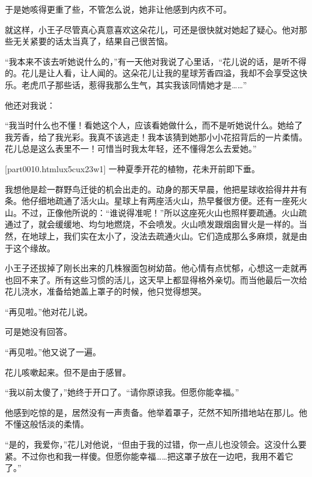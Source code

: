 于是她咳得更重了些，不管怎么说，她非让他感到内疚不可。

就这样，小王子尽管真心真意喜欢这朵花儿，可还是很快就对她起了疑心。他对那些无关紧要的话太当真了，结果自己很苦恼。

“我本来不该去听她说什么的，”有一天他对我说了心里话，“花儿说的话，是听不得的。花儿是让人看，让人闻的。这朵花儿让我的星球芳香四溢，我却不会享受这快乐。老虎爪子那些话，惹得我那么生气，其实我该同情她才是\ldots{}\ldots{}”

{\startalignment[center]
 \stopalignment}

他还对我说：

“我当时什么也不懂！看她这个人，应该看她做什么，而不是听她说什么。她给了我芳香，给了我光彩。我真不该逃走！我本该猜到她那小小花招背后的一片柔情。花儿总是这么表里不一！可惜当时我太年轻，还不懂得怎么去爱她。”

\thinrule

\goto{{[}1{]}}[part0010.htmlux5cux23w1]
一种夏季开花的植物，花未开前即下垂。


\stoptitle

\starttitle[title={9},reference={part0011.html_a012}]

我想他是趁一群野鸟迁徙的机会出走的。动身的那天早晨，他把星球收拾得井井有条。他仔细地疏通了活火山。星球上有两座活火山，热早餐很方便。还有一座死火山。不过，正像他所说的：“谁说得准呢！”所以这座死火山也照样要疏通。火山疏通过了，就会缓缓地、均匀地燃烧，不会喷发。火山喷发跟烟囱冒火是一样的。当然，在地球上，我们实在太小了，没法去疏通火山。它们造成那么多麻烦，就是由于这个缘故。

小王子还拔掉了刚长出来的几株猴面包树幼苗。他心情有点忧郁，心想这一走就再也回不来了。所有这些习惯的活儿，这天早上都显得格外亲切。而当他最后一次给花儿浇水，准备给她盖上罩子的时候，他只觉得想哭。

“再见啦。”他对花儿说。

可是她没有回答。

“再见啦。”他又说了一遍。

花儿咳嗽起来。但不是由于感冒。

“我以前太傻了，”她终于开口了。“请你原谅我。但愿你能幸福。”

他感到吃惊的是，居然没有一声责备。他举着罩子，茫然不知所措地站在那儿。他不懂这般恬淡的柔情。

“是的，我爱你，”花儿对他说，“但由于我的过错，你一点儿也没领会。这没什么要紧。不过你也和我一样傻。但愿你能幸福\ldots{}\ldots{}把这罩子放在一边吧，我用不着它了。”

